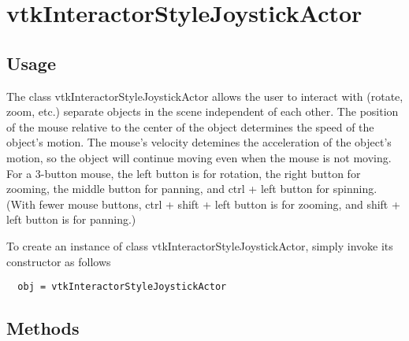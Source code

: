 \section{vtkInteractorStyleJoystickActor}

\subsection{Usage}

 The class vtkInteractorStyleJoystickActor allows the user to interact
 with (rotate, zoom, etc.) separate objects in the scene independent of
 each other.  The position of the mouse relative to the center of the
 object determines the speed of the object's motion.  The mouse's velocity
 detemines the acceleration of the object's motion, so the object will
 continue moving even when the mouse is not moving.
 For a 3-button mouse, the left button is for rotation, the right button
 for zooming, the middle button for panning, and ctrl + left button for
 spinning.  (With fewer mouse buttons, ctrl + shift + left button is
 for zooming, and shift + left button is for panning.)

To create an instance of class vtkInteractorStyleJoystickActor, simply
invoke its constructor as follows
\begin{verbatim}
  obj = vtkInteractorStyleJoystickActor
\end{verbatim}
\subsection{Methods}

